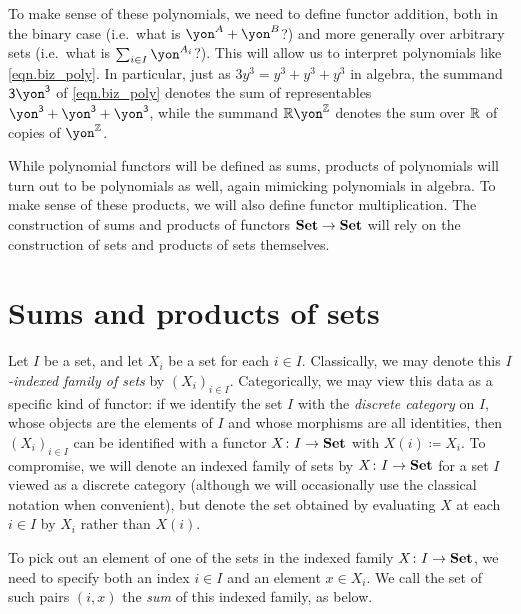\documentclass[Book-Poly]{subfiles}
\begin{document}
To make sense of these polynomials, we need to define functor addition,%
 both in the binary case (i.e.\ what is $\yon^A+\yon^B$?) and more generally over arbitrary sets (i.e.\ what is $\sum_{i\in I}\yon^{A_i}$?).
This will allow us to interpret polynomials like \eqref{eqn.biz_poly}.
In particular, just as $3y^3=y^3+y^3+y^3$ in algebra, the summand $\3\yon^\3$ of \eqref{eqn.biz_poly} denotes the sum of representables $\yon^\3+\yon^\3+\yon^\3$, while the summand $\rr\yon^\zz$ denotes the sum over $\mathbb{R}$ of copies of $\yon^\zz$.

While polynomial functors will be defined as sums, products of polynomials will turn out to be polynomials as well, again mimicking polynomials in algebra.
To make sense of these products, we will also define functor multiplication.
The construction of sums and products of functors $\mathbf{Set}\to\mathbf{Set}$ will rely on the construction of sets and products of sets themselves.

\section{Sums and products of sets} \label{sec.poly.rep-sets.sum-prod-set}


Let $I$ be a set, and let $X_i$ be a set for each $i\in I$.
Classically, we may denote this \emph{$I$-indexed family of sets} by $(X_i)_{i\in I}$.
Categorically, we may view this data as a specific kind of functor: if we identify the set $I$ with the \emph{discrete category} on $I$, whose objects are the elements of $I$ and whose morphisms are all identities, then $(X_i)_{i\in I}$ can be identified with a functor $X\colon I\to\mathbf{Set}$ with $X(i)\coloneqq X_i$.
To compromise, we will denote an indexed family of sets by $X\colon I\to\mathbf{Set}$ for a set $I$ viewed as a discrete category (although we will occasionally use the classical notation when convenient), but denote the set obtained by evaluating $X$ at each $i\in I$ by $X_i$ rather than $X(i)$.

To pick out an element of one of the sets in the indexed family $X\colon I\to\mathbf{Set}$, we need to specify both an index $i\in I$ and an element $x\in X_i$.
We call the set of such pairs $(i,x)$ the \emph{sum} of this indexed family, as below.
\end{document}
